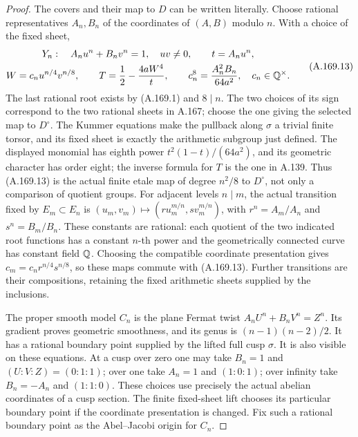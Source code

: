 \begin{proof}
The covers and their map to \(D\) can be written literally.
Choose rational representatives \(A_n,B_n\) of the coordinates
of \((A,B)\) modulo \(n\).  With a choice of the fixed sheet,
\[
 \begin{gathered}
 Y_n:\quad A_nu^n+B_nv^n=1,\quad uv\ne0,
                  \qquad t=A_nu^n,\\
 W=c_nu^{n/4}v^{n/8},\qquad
 T=\frac12-\frac{4aW^4}{t},\qquad
 c_n^8=\frac{A_n^2B_n}{64a^2},\quad c_n\in\mathbb Q^\times.
 \end{gathered}
\tag{A.169.13}
\]
The last rational root exists by (A.169.1) and \(8\mid n\).
The two choices of its sign correspond to the two rational sheets
in A.167; choose the one giving the selected map to \(D^\circ\).
The Kummer equations make the pullback along \(\sigma\) a
trivial finite torsor, and its fixed sheet is exactly the arithmetic
subgroup just defined.  The displayed monomial has eighth power
\(t^2(1-t)/(64a^2)\), and its geometric character has order eight;
the inverse formula for \(T\) is the one in A.139.
Thus (A.169.13) is the actual finite etale map of degree \(n^2/8\)
to \(D^\circ\), not only a comparison of quotient groups.
For adjacent levels \(n\mid m\), the actual transition fixed by
\(E_m\subset E_n\) is
\((u_m,v_m)\mapsto(ru_m^{m/n},sv_m^{m/n})\), with
\(r^n=A_m/A_n\) and \(s^n=B_m/B_n\).
These constants are rational: each quotient of the two indicated
root functions has a constant \(n\)-th power and the geometrically
connected curve has constant field \(\mathbb Q\).
Choosing the compatible coordinate presentation gives
\(c_m=c_nr^{n/4}s^{n/8}\), so these maps commute with
(A.169.13).  Further transitions are their compositions, retaining
the fixed arithmetic sheets supplied by the inclusions.

The proper smooth model \(C_n\) is the plane Fermat twist
\(A_nU^n+B_nV^n=Z^n\).  Its gradient proves geometric
smoothness, and its genus is \((n-1)(n-2)/2\).
It has a rational boundary point supplied by the lifted full cusp
\(\sigma\).  It is also visible on these equations.  At a cusp
over zero one may take \(B_n=1\) and \((U:V:Z)=(0:1:1)\);
over one take \(A_n=1\) and \((1:0:1)\); over infinity take
\(B_n=-A_n\) and \((1:1:0)\).  These choices use precisely
the actual abelian coordinates of a cusp section.  The finite
fixed-sheet lift chooses its particular boundary point if the
coordinate presentation is changed.  Fix such a rational boundary
point as the Abel--Jacobi origin for \(C_n\).


\end{proof}
